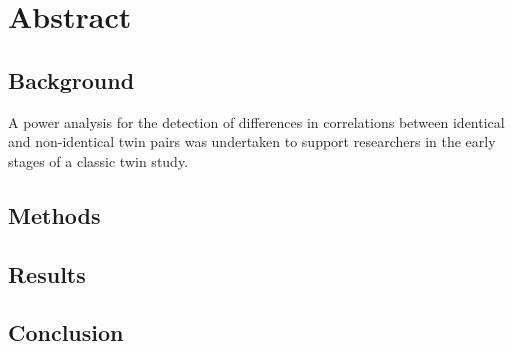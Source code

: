 \section*{Abstract}


\subsection*{Background}
A power analysis for the detection of differences in correlations between identical and non-identical twin pairs was undertaken to support researchers in the early stages of a classic twin study.

\subsection*{Methods}


\subsection*{Results}

\subsection*{Conclusion}  

